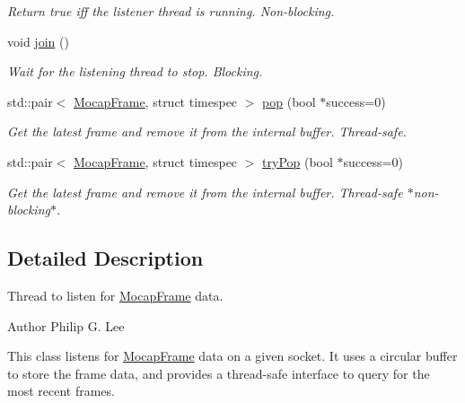 \begin{DoxyCompactItemize}
\begin{DoxyCompactList}\small\item\em \-Return true iff the listener thread is running. \-Non-\/blocking. \end{DoxyCompactList}\item 
\hypertarget{classFrameListener_a5b07340a6aa4406367224b388663b461}{void \hyperlink{classFrameListener_a5b07340a6aa4406367224b388663b461}{join} ()}\label{classFrameListener_a5b07340a6aa4406367224b388663b461}

\begin{DoxyCompactList}\small\item\em \-Wait for the listening thread to stop. \-Blocking. \end{DoxyCompactList}\item 
std\-::pair$<$ \hyperlink{classMocapFrame}{\-Mocap\-Frame}, struct \*
timespec $>$ \hyperlink{classFrameListener_a44a4272610cf1661ea17c4c88b866998}{pop} (bool $\ast$success=0)
\begin{DoxyCompactList}\small\item\em \-Get the latest frame and remove it from the internal buffer. \-Thread-\/safe. \end{DoxyCompactList}\item 
std\-::pair$<$ \hyperlink{classMocapFrame}{\-Mocap\-Frame}, struct \*
timespec $>$ \hyperlink{classFrameListener_a7935ea8156438edcf0135a5c0c868ca2}{try\-Pop} (bool $\ast$success=0)
\begin{DoxyCompactList}\small\item\em \-Get the latest frame and remove it from the internal buffer. \-Thread-\/safe $\ast$non-\/blocking$\ast$. \end{DoxyCompactList}\end{DoxyCompactItemize}


\subsection{\-Detailed \-Description}
\-Thread to listen for \hyperlink{classMocapFrame}{\-Mocap\-Frame} data. 

\begin{DoxyAuthor}{\-Author}
\-Philip \-G. \-Lee
\end{DoxyAuthor}
\-This class listens for \hyperlink{classMocapFrame}{\-Mocap\-Frame} data on a given socket. \-It uses a circular buffer to store the frame data, and provides a thread-\/safe interface to query for the most recent frames. 

